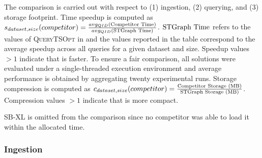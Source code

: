 The comparison is carried out with respect to (1) ingestion, (2) querying, and (3) storage footprint.
Time speedup is computed as $s_{dataset, size}(competitor)=\frac{avg_{QID}(\textup{Competitor Time})}{avg_{QID}(\textup{\ourapproach Time})}$.
$\textup{\ourapproach Time}$ refers to the values of \textsc{QueryTSOpt} in  and the values reported in the table correspond to the average speedup across all queries for a given dataset and size.
Speedup values $>1$ indicate that \ourapproach is faster.
To ensure a fair comparison, all solutions were evaluated under a single-threaded execution environment and average performance is obtained by aggregating twenty experimental runs.
Storage compression is computed as $c_{dataset, size}(competitor)=\frac{\textup{Competitor Storage (MB)}}{\textup{\ourapproach Storage (MB)}}$.
Compression values $>1$ indicate that \ourapproach is more compact.

\textsf{SB}-XL is omitted from the comparison since no competitor was able to load it within the allocated time. 

\subsubsection{Ingestion}

